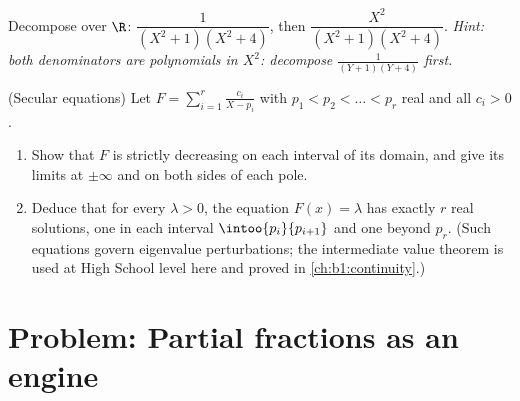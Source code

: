 \begin{exercise}[$\star\star$]\label{exo:b1:fractions:11}
Decompose over $\R$: $\dfrac{1}{(X^2+1)(X^2+4)}$, then
$\dfrac{X^2}{(X^2+1)(X^2+4)}$. \emph{Hint: both denominators are
polynomials in $X^2$: decompose $\frac1{(Y+1)(Y+4)}$ first.}
\end{exercise}

\begin{exercise}[$\star\star\star$]\label{exo:b1:fractions:12}
(Secular equations) Let $F = \sum_{i=1}^{r} \frac{c_i}{X - p_i}$
with $p_1 < p_2 < \dots < p_r$ real and all $c_i > 0$.
\begin{enumerate}
  \item Show that $F$ is strictly decreasing on each interval of
        its domain, and give its limits at $\pm\infty$ and on both
        sides of each pole.
  \item Deduce that for every $\lambda > 0$, the equation $F(x) =
        \lambda$ has exactly $r$ real solutions, one in each
        interval $\intoo{p_i}{p_{i+1}}$ and one beyond $p_r$.
        (Such equations govern eigenvalue perturbations; the
        intermediate value theorem is used at High School level
        here and proved in \cref{ch:b1:continuity}.)
\end{enumerate}
\end{exercise}

\section{Problem: Partial fractions as an engine}

